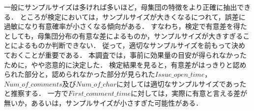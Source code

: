 一般にサンプルサイズは多ければ多いほど，母集団の特徴をより正確に抽出できる．
ところが検定においては，サンプルサイズが大きくなるにつれて，誤差に過敏になり有意確率が小さくなる傾向がある．
すなわち，検定で有意差を得たとしても，母集団分布の有意な差によるものか，サンプルサイズが大きすぎることによるものか判断できない．
従って，適切なサンプルサイズを前もって決めておくことが重要である．
本調査では，事前に効果量の目安が得られなかったために，やや恣意的に決定した．
検定結果を見ると，有意差がはっきりと認められた部分と，認められなかった部分が見られた$Issue\_open\_time$，$Num\_of\_comments$及び$Num\_of\_char$に対しては適切なサンプルサイズであったと推察する．
一方で$First\_comment\_time$に対しては，実際に有意と言える差が無いか，あるいは，サンプルサイズが小さすぎた可能性がある．

